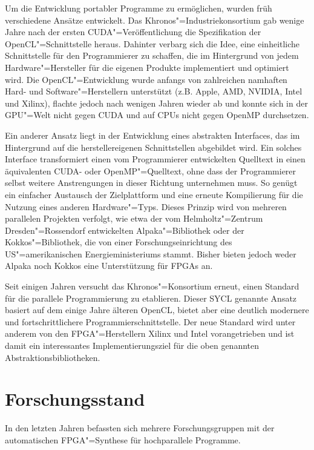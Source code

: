 Um die Entwicklung portabler Programme zu ermöglichen, wurden früh verschiedene
Ansätze entwickelt. Das Khronos"=Industriekonsortium gab wenige Jahre nach der
ersten CUDA"=Veröffentlichung die Spezifikation der OpenCL"=Schnittstelle
heraus. Dahinter verbarg sich die Idee, eine einheitliche Schnittstelle für den
Programmierer zu schaffen, die im Hintergrund von jedem Hardware"=Hersteller für
die eigenen Produkte implementiert und optimiert wird. Die OpenCL"=Entwicklung
wurde anfangs von zahlreichen namhaften Hard- und Software"=Herstellern
unterstützt (z.B. Apple, AMD, NVIDIA, Intel und Xilinx), flachte jedoch nach
wenigen Jahren wieder ab und konnte sich in der GPU"=Welt nicht gegen CUDA
und auf CPUs nicht gegen OpenMP durchsetzen.

Ein anderer Ansatz liegt in der Entwicklung eines abstrakten Interfaces, das im
Hintergrund auf die herstellereigenen Schnittstellen abgebildet wird. Ein solches
Interface transformiert einen vom Programmierer entwickelten Quelltext in einen
äquivalenten CUDA- oder OpenMP"=Quelltext, ohne dass der Programmierer selbst
weitere Anstrengungen in dieser Richtung unternehmen muss. So genügt ein
einfacher Austausch der Zielplattform und eine erneute Kompilierung für die
Nutzung eines anderen Hardware"=Typs. Dieses Prinzip wird von mehreren
parallelen Projekten verfolgt, wie etwa der vom Helmholtz"=Zentrum
Dresden"=Rossendorf entwickelten Alpaka"=Bibliothek oder der Kokkos"=Bibliothek,
die von einer Forschungseinrichtung des US"=amerikanischen Energieministeriums
stammt. Bisher bieten jedoch weder Alpaka noch Kokkos eine Unterstützung für
FPGAs an.

Seit einigen Jahren versucht das Khronos"=Konsortium erneut, einen Standard für
die parallele Programmierung zu etablieren. Dieser SYCL genannte Ansatz basiert
auf dem einige Jahre älteren OpenCL, bietet aber eine deutlich modernere und
fortschrittlichere Programmierschnittstelle. Der neue Standard wird unter
anderem von den FPGA"=Herstellern Xilinx und Intel vorangetrieben und ist damit
ein interessantes Implementierungsziel für die oben genannten
Abstraktionsbibliotheken.

\section{Forschungsstand}\label{einleitung:forschung}

In den letzten Jahren befassten sich mehrere Forschungsgruppen mit der
automatischen \mbox{FPGA}"=Synthese für hochparallele Programme.

